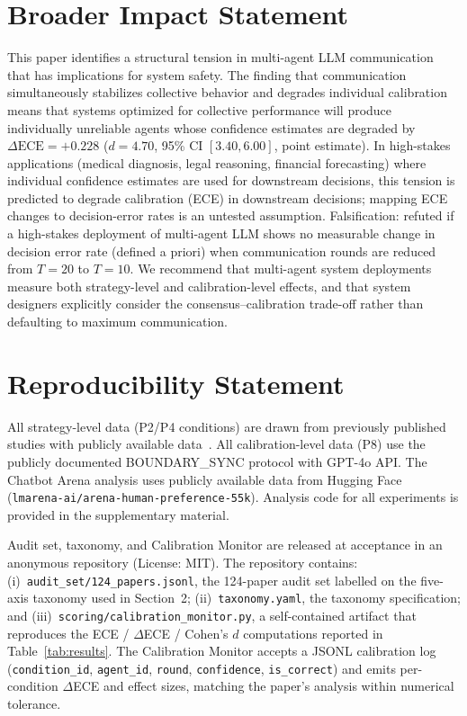 \documentclass[11pt]{article}
\begin{document}
\section*{Broader Impact Statement}

This paper identifies a structural tension in multi-agent LLM communication that has implications for system safety. The finding that communication simultaneously stabilizes collective behavior and degrades individual calibration means that systems optimized for collective performance will produce individually unreliable agents whose confidence estimates are degraded by $\Delta\text{ECE} = +0.228$ ($d = 4.70$, 95\% CI $[3.40, 6.00]$, point estimate). In high-stakes applications (medical diagnosis, legal reasoning, financial forecasting) where individual confidence estimates are used for downstream decisions, this tension is predicted to degrade calibration (ECE) in downstream decisions; mapping ECE changes to decision-error rates is an untested assumption. Falsification: refuted if a high-stakes deployment of multi-agent LLM shows no measurable change in decision error rate (defined a priori) when communication rounds are reduced from $T = 20$ to $T = 10$. We recommend that multi-agent system deployments measure both strategy-level and calibration-level effects, and that system designers explicitly consider the consensus--calibration trade-off rather than defaulting to maximum communication.

\section*{Reproducibility Statement}

All strategy-level data (P2/P4 conditions) are drawn from previously published studies with publicly available data~\cite{liu2026mmepc}. All calibration-level data (P8) use the publicly documented BOUNDARY\_SYNC protocol with GPT-4o API. The Chatbot Arena analysis uses publicly available data from Hugging Face (\texttt{lmarena-ai/arena-human-preference-55k}). Analysis code for all experiments is provided in the supplementary material.

Audit set, taxonomy, and Calibration Monitor are released at acceptance in an anonymous repository (License: MIT).
The repository contains: (i)~\texttt{audit\_set/124\_papers.jsonl}, the
124-paper audit set labelled on the five-axis taxonomy used in
Section~2; (ii)~\texttt{taxonomy.yaml}, the taxonomy specification;
and (iii)~\texttt{scoring/calibration\_monitor.py}, a self-contained artifact
that reproduces the ECE / $\Delta$ECE / Cohen's $d$ computations reported in
Table~\ref{tab:results}. The Calibration Monitor accepts a JSONL
calibration log (\texttt{condition\_id}, \texttt{agent\_id}, \texttt{round},
\texttt{confidence}, \texttt{is\_correct}) and emits per-condition
$\Delta$ECE and effect sizes, matching the paper's analysis within numerical
tolerance.
\end{document}
